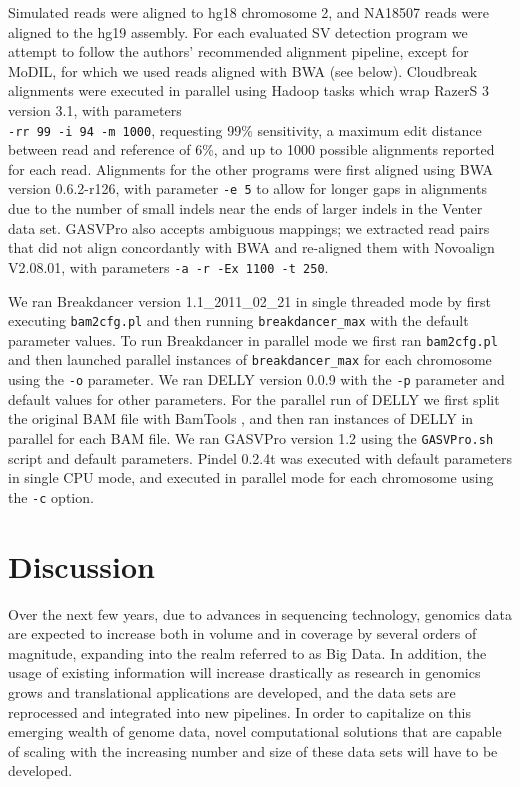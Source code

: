 \documentclass[11pt]{article}
\begin{document}
Simulated reads were aligned to hg18 chromosome 2, and NA18507 reads were aligned to the hg19 assembly. For each evaluated SV detection program we attempt to follow the authors' recommended alignment pipeline, except for MoDIL, for which we used reads aligned with BWA (see below). Cloudbreak alignments were executed in parallel using Hadoop tasks which wrap RazerS 3 version 3.1, with parameters \\ \verb|-rr 99 -i 94 -m 1000|, requesting 99\% sensitivity, a maximum edit distance between read and reference of 6\%, and up to 1000 possible alignments reported for each read. Alignments for the other programs were first aligned using BWA \autocite{Li:2009p836} version 0.6.2-r126, with parameter \verb|-e 5| to allow for longer gaps in alignments due to the number of small indels near the ends of larger indels in the Venter data set. GASVPro also accepts ambiguous mappings; we extracted read pairs that did not align concordantly with BWA and re-aligned them with Novoalign V2.08.01, with parameters \verb|-a -r -Ex 1100 -t 250|. 

We ran Breakdancer version 1.1\_2011\_02\_21 in single threaded mode by first executing \verb|bam2cfg.pl| and then running \verb|breakdancer_max| with the default parameter values. To run Breakdancer in parallel mode we first ran \verb|bam2cfg.pl| and then launched parallel instances of \verb|breakdancer_max| for each chromosome using the \verb|-o| parameter. We ran DELLY version 0.0.9 with the \verb|-p| parameter and default values for other parameters. For the parallel run of DELLY we first split the original BAM file with BamTools \cite{Barnett:2011hm}, and then ran instances of DELLY in parallel for each BAM file. We ran GASVPro version 1.2 using the \verb|GASVPro.sh| script and default parameters. Pindel 0.2.4t was executed with default parameters in single CPU mode, and executed in parallel mode for each chromosome using the \verb|-c| option.

\section{Discussion}\label{Discussion}

Over the next few years, due to advances in sequencing technology, genomics data are expected to increase both in volume and in coverage by several orders of magnitude, expanding into the realm referred to as Big Data. In addition, the usage of existing information will increase drastically as research in genomics grows and translational applications are developed, and the data sets are reprocessed and integrated into new pipelines. In order to capitalize on this emerging wealth of genome data, novel computational solutions that are capable of scaling with the increasing number and size of these data sets will have to be developed. 
\end{document}
